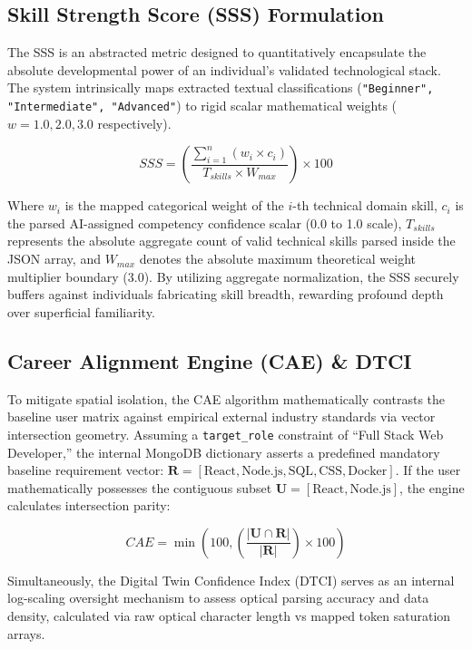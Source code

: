 \documentclass[conference]{IEEEtran}
\begin{document}
\subsection{Skill Strength Score (SSS) Formulation}
The SSS is an abstracted metric designed to quantitatively encapsulate the absolute developmental power of an individual's validated technological stack. The system intrinsically maps extracted textual classifications (\texttt{"Beginner", "Intermediate", "Advanced"}) to rigid scalar mathematical weights ($w = 1.0, 2.0, 3.0$ respectively).

\begin{equation}
SSS = \left( \frac{\sum_{i=1}^{n} (w_i \times c_i)}{T_{skills} \times W_{max}} \right) \times 100
\end{equation}

Where $w_i$ is the mapped categorical weight of the $i$-th technical domain skill, $c_i$ is the parsed AI-assigned competency confidence scalar (0.0 to 1.0 scale), $T_{skills}$ represents the absolute aggregate count of valid technical skills parsed inside the JSON array, and $W_{max}$ denotes the absolute maximum theoretical weight multiplier boundary (3.0). By utilizing aggregate normalization, the SSS securely buffers against individuals fabricating skill breadth, rewarding profound depth over superficial familiarity.

\subsection{Career Alignment Engine (CAE) \& DTCI}
To mitigate spatial isolation, the CAE algorithm mathematically contrasts the baseline user matrix against empirical external industry standards via vector intersection geometry. Assuming a \texttt{target\_role} constraint of ``Full Stack Web Developer,'' the internal MongoDB dictionary asserts a predefined mandatory baseline requirement vector: $\mathbf{R} = [\text{React}, \text{Node.js}, \text{SQL}, \text{CSS}, \text{Docker}]$. If the user mathematically possesses the contiguous subset $ \mathbf{U} = [\text{React}, \text{Node.js}] $, the engine calculates intersection parity:

\begin{equation}
CAE = \min\left(100, \left( \frac{|\mathbf{U} \cap \mathbf{R}|}{|\mathbf{R}|} \right) \times 100 \right)
\end{equation}

Simultaneously, the Digital Twin Confidence Index (DTCI) serves as an internal log-scaling oversight mechanism to assess optical parsing accuracy and data density, calculated via raw optical character length vs mapped token saturation arrays.
\end{document}
